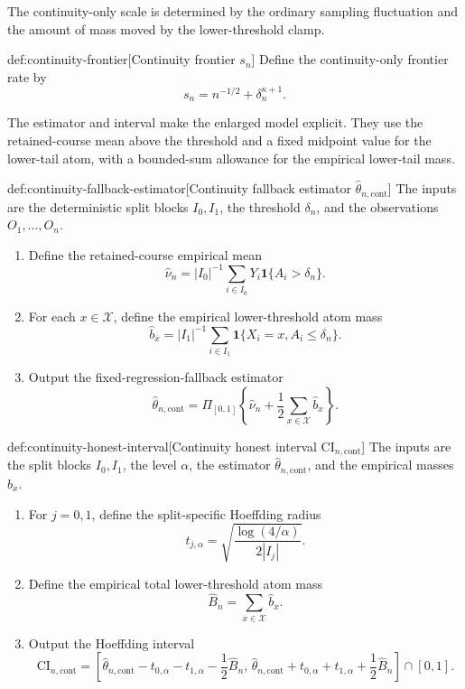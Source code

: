 The continuity-only scale is determined by the ordinary sampling fluctuation and the amount of mass moved by the lower-threshold clamp.

\begin{definitionv}{def:continuity-frontier}[Continuity frontier \(s_n\)]
Define the continuity-only frontier rate by
\[
s_n=n^{-1/2}+\delta_n^{\kappa+1}.
\]
\end{definitionv}

The estimator and interval make the enlarged model explicit. They use the retained-course mean above the threshold and a fixed midpoint value for the lower-tail atom, with a bounded-sum allowance for the empirical lower-tail mass.

\begin{algorithmv}{def:continuity-fallback-estimator}[Continuity fallback estimator \(\widehat\theta_{n,\mathrm{cont}}\)]
The inputs are the deterministic split blocks \(I_0,I_1\), the threshold \(\delta_n\), and the observations \(O_1,\ldots,O_n\).
\begin{enumerate}
\item Define the retained-course empirical mean
\[
\widehat\nu_n
=
|I_0|^{-1}\sum_{i\in I_0}Y_i\mathbf 1\{A_i>\delta_n\}.
\]
\item For each \(x\in\mathcal X\), define the empirical lower-threshold atom mass
\[
\widehat b_x
=
|I_1|^{-1}\sum_{i\in I_1}\mathbf 1\{X_i=x,A_i\leq\delta_n\}.
\]
\item Output the fixed-regression-fallback estimator
\[
\widehat\theta_{n,\mathrm{cont}}
=
\Pi_{[0,1]}\left\{\widehat\nu_n+\frac12\sum_{x\in\mathcal X}\widehat b_x\right\}.
\]
\end{enumerate}
\end{algorithmv}

\begin{algorithmv}{def:continuity-honest-interval}[Continuity honest interval \(\mathrm{CI}_{n,\mathrm{cont}}\)]
The inputs are the split blocks \(I_0,I_1\), the level \(\alpha\), the estimator \(\widehat\theta_{n,\mathrm{cont}}\), and the empirical masses \(\widehat b_x\).
\begin{enumerate}
\item For \(j=0,1\), define the split-specific Hoeffding radius
\[
t_{j,\alpha}
=
\sqrt{\frac{\log(4/\alpha)}{2|I_j|}}.
\]
\item Define the empirical total lower-threshold atom mass
\[
\widehat B_n
=
\sum_{x\in\mathcal X}\widehat b_x.
\]
\item Output the Hoeffding interval
\[
\mathrm{CI}_{n,\mathrm{cont}}
=
\left[
\widehat\theta_{n,\mathrm{cont}}-t_{0,\alpha}-t_{1,\alpha}-\frac12\widehat B_n,\,
\widehat\theta_{n,\mathrm{cont}}+t_{0,\alpha}+t_{1,\alpha}+\frac12\widehat B_n
\right]\cap[0,1].
\]
\end{enumerate}
\end{algorithmv}

